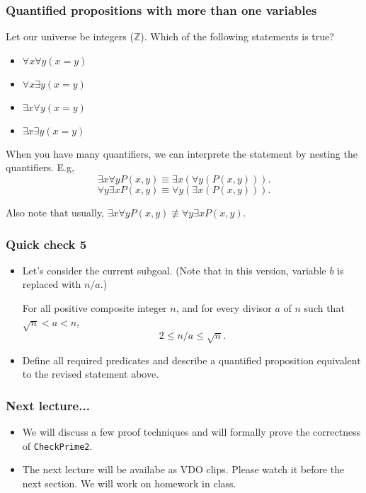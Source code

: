 \documentclass{beamer}
\begin{document}
\begin{frame}\frametitle{Quantified propositions with more than one variables}
  Let our universe be integers ($\mathbb Z$).  Which of the following statements is true?

  \begin{itemize}
  \item $\forall x\forall y (x=y)$
  \item $\forall x\exists y (x=y)$
  \item $\exists x\forall y (x=y)$
  \item $\exists x\exists y (x=y)$
  \end{itemize}

  \pause

  When you have many quantifiers, we can interprete the statement by
  nesting the quantifiers. E.g,
  \[\exists x\forall y P(x,y)\equiv \exists x (\forall y (P(x,y))).\]
  \[\forall y\exists x P(x,y)\equiv \forall y (\exists x (P(x,y))).\]
  \pause

  Also note that usually, $\exists x\forall y P(x,y)\not\equiv \forall
  y\exists x P(x,y)$.
\end{frame}

\begin{frame}\frametitle{Quick check 5}
  \begin{itemize}
  \item Let's consider the current subgoal.  (Note that in this
    version, variable $b$ is replaced with $n/a$.)
    
    \begin{tcolorbox}[title=Another revised statement]
      For all positive composite integer $n$, and for every divisor
      $a$ of $n$ such that $\sqrt{n} < a < n$,
      \[ 2\leq n/a \leq\sqrt{n}.\]
    \end{tcolorbox}

  \item Define all required predicates and describe a quantified
    proposition equivalent to the revised statement above.

    \vspace{1in}
    
  \end{itemize}
\end{frame}

\begin{frame}\frametitle{Next lecture...}
  \begin{itemize}
  \item
    We will discuss a few proof techniques and will formally prove the
    correctness of {\tt CheckPrime2}.

  \item
    The next lecture will be availabe as VDO clips.  Please watch it
    before the next section.  We will work on homework in class.
  \end{itemize}
\end{frame}
\end{document}
